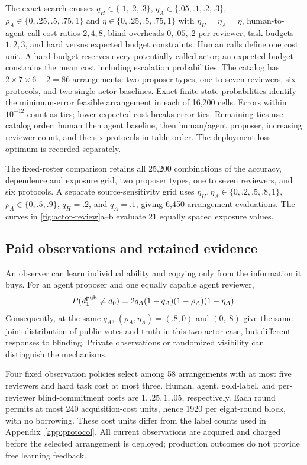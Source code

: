 The exact search crosses $q_H\in\{.1,.2,.3\}$, $q_A\in\{.05,.1,.2,.3\}$, $\rho_A\in\{0,.25,.5,.75,1\}$ and $\eta\in\{0,.25,.5,.75,1\}$ with $\eta_H=\eta_A=\eta$, human-to-agent call-cost ratios $2,4,8$, blind overheads $0,.05,.2$ per reviewer, task budgets $1,2,3$, and hard versus expected budget constraints. Human calls define one cost unit. A hard budget reserves every potentially called actor; an expected budget constrains the mean cost including escalation probabilities. The catalog has $2\times7\times6+2=86$ arrangements: two proposer types, one to seven reviewers, six protocols, and two single-actor baselines. Exact finite-state probabilities identify the minimum-error feasible arrangement in each of 16,200 cells. Errors within $10^{-12}$ count as ties; lower expected cost breaks error ties. Remaining ties use catalog order: human then agent baseline, then human/agent proposer, increasing reviewer count, and the six protocols in table order. The deployment-loss optimum is recorded separately.

The fixed-roster comparison retains all 25,200 combinations of the accuracy, dependence and exposure grid, two proposer types, one to seven reviewers, and six protocols. A separate source-sensitivity grid uses $\eta_H,\eta_A\in\{0,.2,.5,.8,1\}$, $\rho_A\in\{0,.5,.9\}$, $q_H=.2$, and $q_A=.1$, giving 6,450 arrangement evaluations. The curves in \cref{fig:actor-review}a--b evaluate 21 equally spaced exposure values.

\subsection{Paid observations and retained evidence}
An observer can learn individual ability and copying only from the information it buys. For an agent proposer and one equally capable agent reviewer,
\[
P(d_1^{\rm pub}\ne d_0)=2q_A(1-q_A)(1-\rho_A)(1-\eta_A).
\]
Consequently, at the same $q_A$, $(\rho_A,\eta_A)=(.8,0)$ and $(0,.8)$ give the same joint distribution of public votes and truth in this two-actor case, but different responses to blinding. Private observations or randomized visibility can distinguish the mechanisms.

Four fixed observation policies select among 58 arrangements with at most five reviewers and hard task cost at most three. Human, agent, gold-label, and per-reviewer blind-commitment costs are $1,.25,1,.05$, respectively. Each round permits at most 240 acquisition-cost units, hence 1920 per eight-round block, with no borrowing. These cost units differ from the label counts used in Appendix~\ref{app:protocol}. All current observations are acquired and charged before the selected arrangement is deployed; production outcomes do not provide free learning feedback.

